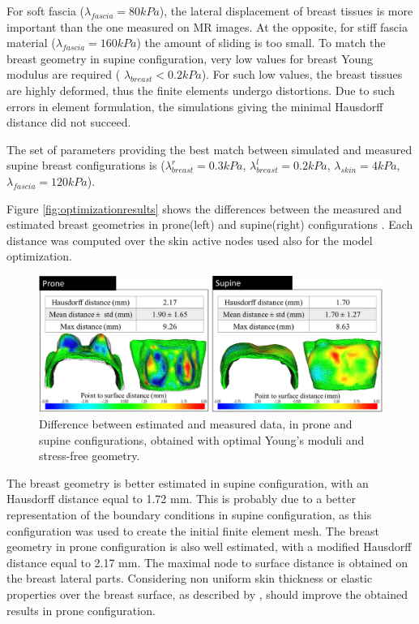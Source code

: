  

For soft fascia ($\lambda_{fascia} = 80kPa$), the lateral displacement of breast tissues is more important than the one measured on MR images. At the opposite, for stiff fascia material ($\lambda_{fascia}=160 kPa$) the amount of sliding is too small. To match the breast geometry in supine configuration, very low values for breast Young modulus are required ( $\lambda_{breast}< 0.2kPa$). For such low values, the breast tissues are highly deformed, thus the finite elements undergo distortions. Due to such errors in element formulation, the simulations giving the minimal Hausdorff distance did not succeed.   

The set of parameters providing the best match between simulated and measured supine breast configurations is ($\lambda_{breast}^r=0.3 kPa$, $\lambda_{breast}^l=0.2 kPa$, $\lambda_{skin}=4 kPa$, $\lambda_{fascia}=120 kPa$).  

Figure \ref{fig:optimizationresults} shows the differences between the measured and estimated breast geometries in prone(left) and supine(right) configurations . Each distance was computed over the skin active nodes used also for the model optimization. 

\begin{figure}[!h]
\centering
\includegraphics[width=\textwidth,keepaspectratio]{figures/optimizationresults.png} 
\caption{Difference  between estimated and measured data, in prone and supine configurations, obtained with optimal Young's moduli and stress-free geometry. }\label{fig:geometryoptimizationresults}
\end{figure}

The breast geometry is better estimated in supine configuration, with an Hausdorff distance equal to 1.72 mm. This is probably due to a better representation of the boundary conditions in supine configuration, as this configuration was used to create the initial finite element mesh. The breast geometry in prone configuration is also well estimated, with a modified Hausdorff distance equal to 2.17 mm. The maximal node to surface distance is obtained on the breast lateral parts.  Considering non uniform skin thickness or elastic properties over the breast surface, as described by \cite{sutradhar_vivo_2013}, should improve the obtained results in prone configuration. 




